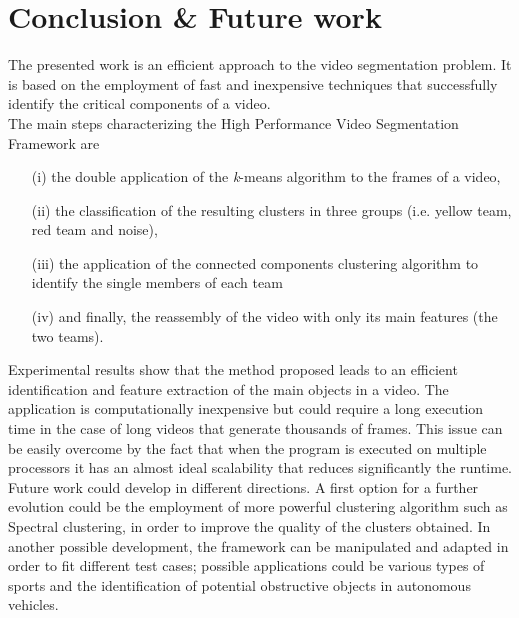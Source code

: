 \documentclass{usiinftr}
\begin{document}
\newpage
\section{Conclusion \& Future work }
The presented work is an efficient approach to the video segmentation problem. It is based on the employment of fast and inexpensive techniques that successfully identify the critical components of a video. \\
The main steps characterizing the High Performance Video Segmentation Framework are 
\begin{itemize}
	\item[(i)] the double application of the \textit{k}-means algorithm to the frames of a video, 
	\item[(ii)] the classification of the resulting clusters in three groups (i.e. yellow team, red team and noise), 
	\item[(iii)] the application of the connected components clustering algorithm to identify the single members of each team
	\item[(iv)] and finally, the reassembly of the video with only its main features (the two teams). \\
\end{itemize}
Experimental results show that the method proposed leads to an efficient identification and feature extraction of the main objects in a video. The application is computationally inexpensive but could require a long execution time in the case of long videos that generate thousands of frames. This issue can be easily overcome by the fact that when the program is executed on multiple processors it has an almost ideal scalability that reduces significantly the runtime. \\
Future work could develop in different directions. A first option for a further evolution could be the employment of more powerful clustering algorithm such as Spectral clustering, in order to improve the quality of the clusters obtained. In another possible development, the framework can be manipulated and adapted in order to fit different test cases; possible applications could be various types of sports and the identification of potential obstructive objects in autonomous vehicles.

  
\end{document}

